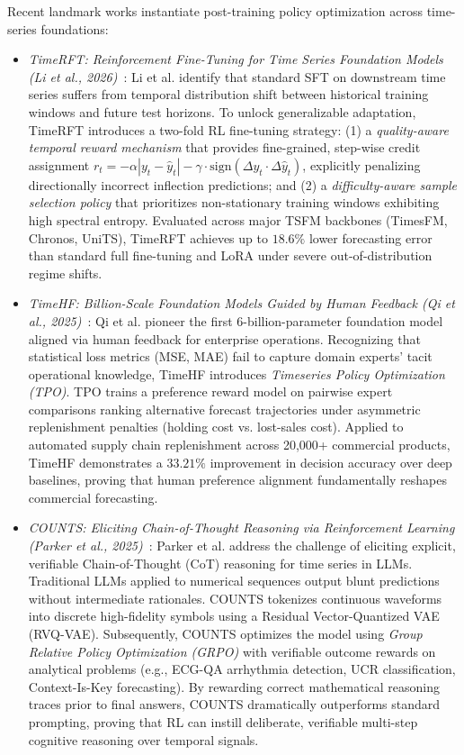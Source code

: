Recent landmark works instantiate post-training policy optimization across time-series foundations:
\begin{itemize}[leftmargin=*]
    \item \emph{TimeRFT: Reinforcement Fine-Tuning for Time Series Foundation Models (Li et al., 2026)}~\cite{li2026timerft}: Li et al. identify that standard SFT on downstream time series suffers from temporal distribution shift between historical training windows and future test horizons. To unlock generalizable adaptation, TimeRFT introduces a two-fold RL fine-tuning strategy: (1) a \emph{quality-aware temporal reward mechanism} that provides fine-grained, step-wise credit assignment $r_t = -\alpha |y_t - \hat{y}_t| - \gamma \cdot \text{sign}(\Delta y_t \cdot \Delta \hat{y}_t)$, explicitly penalizing directionally incorrect inflection predictions; and (2) a \emph{difficulty-aware sample selection policy} that prioritizes non-stationary training windows exhibiting high spectral entropy. Evaluated across major TSFM backbones (TimesFM, Chronos, UniTS), TimeRFT achieves up to $18.6\%$ lower forecasting error than standard full fine-tuning and LoRA under severe out-of-distribution regime shifts.
    \item \emph{TimeHF: Billion-Scale Foundation Models Guided by Human Feedback (Qi et al., 2025)}~\cite{qi2025timehf}: Qi et al. pioneer the first 6-billion-parameter foundation model aligned via human feedback for enterprise operations. Recognizing that statistical loss metrics (MSE, MAE) fail to capture domain experts' tacit operational knowledge, TimeHF introduces \emph{Timeseries Policy Optimization (TPO)}. TPO trains a preference reward model on pairwise expert comparisons ranking alternative forecast trajectories under asymmetric replenishment penalties (holding cost vs. lost-sales cost). Applied to automated supply chain replenishment across 20,000+ commercial products, TimeHF demonstrates a $33.21\%$ improvement in decision accuracy over deep baselines, proving that human preference alignment fundamentally reshapes commercial forecasting.
    \item \emph{COUNTS: Eliciting Chain-of-Thought Reasoning via Reinforcement Learning (Parker et al., 2025)}~\cite{parker2025counts}: Parker et al. address the challenge of eliciting explicit, verifiable Chain-of-Thought (CoT) reasoning for time series in LLMs. Traditional LLMs applied to numerical sequences output blunt predictions without intermediate rationales. COUNTS tokenizes continuous waveforms into discrete high-fidelity symbols using a Residual Vector-Quantized VAE (RVQ-VAE). Subsequently, COUNTS optimizes the model using \emph{Group Relative Policy Optimization (GRPO)} with verifiable outcome rewards on analytical problems (e.g., ECG-QA arrhythmia detection, UCR classification, Context-Is-Key forecasting). By rewarding correct mathematical reasoning traces prior to final answers, COUNTS dramatically outperforms standard prompting, proving that RL can instill deliberate, verifiable multi-step cognitive reasoning over temporal signals.

\end{itemize}

